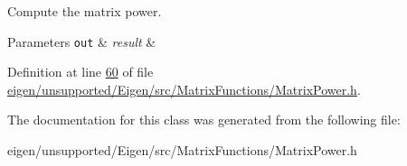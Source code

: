 Compute the matrix power. 


\begin{DoxyParams}[1]{Parameters}
\mbox{\tt out}  & {\em result} & \\
\hline
\end{DoxyParams}


Definition at line \hyperlink{eigen_2unsupported_2_eigen_2src_2_matrix_functions_2_matrix_power_8h_source_l00060}{60} of file \hyperlink{eigen_2unsupported_2_eigen_2src_2_matrix_functions_2_matrix_power_8h_source}{eigen/unsupported/\+Eigen/src/\+Matrix\+Functions/\+Matrix\+Power.\+h}.



The documentation for this class was generated from the following file\+:\begin{DoxyCompactItemize}
\item 
eigen/unsupported/\+Eigen/src/\+Matrix\+Functions/\+Matrix\+Power.\+h\end{DoxyCompactItemize}
